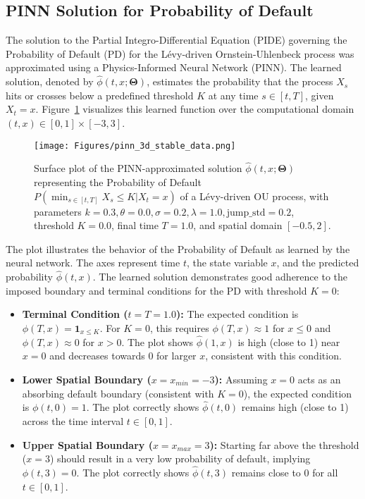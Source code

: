\documentclass[11pt,twoside,openright]{report}
\begin{document}
\subsection{PINN Solution for Probability of Default}
\label{sec:pinn_pd_solution_results} %
 
The solution to the Partial Integro-Differential Equation (PIDE) governing the Probability of Default (PD) for the Lévy-driven Ornstein-Uhlenbeck process was approximated using a Physics-Informed Neural Network (PINN). The learned solution, denoted by $\hat{\phi}(t, x; \mathbf{\Theta})$, estimates the probability that the process $X_s$ hits or crosses below a predefined threshold $K$ at any time $s \in [t, T]$, given $X_t = x$. Figure~\ref{fig:pinn_levy_ou_pd_solution} visualizes this learned function over the computational domain $(t, x) \in [0, 1] \times [-3, 3]$.
 
\begin{figure}[htbp]
    \centering
    \texttt{[image: Figures/pinn\_3d\_stable\_data.png]} %
    \caption{Surface plot of the PINN-approximated solution $\hat{\phi}(t, x; \mathbf{\Theta})$ representing the Probability of Default $P(\min_{s \in [t, T]} X_s \le K | X_t = x)$ of a Lévy-driven OU process, with parameters $k=0.3, \theta=0.0, \sigma=0.2, \lambda=1.0, \text{jump\_std}=0.2$, threshold $K=0.0$, final time $T=1.0$, and spatial domain $[-0.5, 2]$.}
    \label{fig:pinn_levy_ou_pd_solution} %
\end{figure}
 
The plot illustrates the behavior of the Probability of Default as learned by the neural network. The axes represent time $t$, the state variable $x$, and the predicted probability $\hat{\phi}(t, x)$. The learned solution demonstrates good adherence to the imposed boundary and terminal conditions for the PD with threshold $K=0$:
 
\begin{itemize}
    \item \textbf{Terminal Condition ($t=T=1.0$):} The expected condition is $\phi(T, x) = \mathbf{1}_{x \le K}$. For $K=0$, this requires $\phi(T, x) \approx 1$ for $x \le 0$ and $\phi(T, x) \approx 0$ for $x > 0$. The plot shows $\hat{\phi}(1, x)$ is high (close to 1) near $x=0$ and decreases towards 0 for larger $x$, consistent with this condition.
    \item \textbf{Lower Spatial Boundary ($x=x_{min}=-3$):} Assuming $x=0$ acts as an absorbing default boundary (consistent with $K=0$), the expected condition is $\phi(t, 0) = 1$. The plot correctly shows $\hat{\phi}(t, 0)$ remains high (close to 1) across the time interval $t \in [0, 1]$.
    \item \textbf{Upper Spatial Boundary ($x=x_{max}=3$):} Starting far above the threshold ($x=3$) should result in a very low probability of default, implying $\phi(t, 3) = 0$. The plot correctly shows $\hat{\phi}(t, 3)$ remains close to 0 for all $t \in [0, 1]$.
\end{itemize}
 
\end{document}
